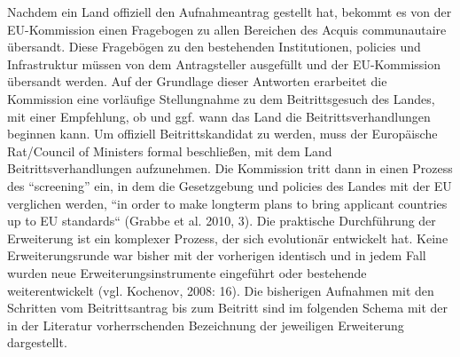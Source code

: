 Nachdem ein Land offiziell den Aufnahmeantrag gestellt hat, bekommt es von der EU-Kommission einen Fragebogen zu allen Bereichen des Acquis communautaire übersandt. Diese Fragebögen zu den bestehenden Institutionen, policies und Infrastruktur müssen von dem Antragsteller ausgefüllt und der EU-Kommission übersandt werden. Auf der Grundlage dieser Antworten erarbeitet die Kommission eine vorläufige Stellungnahme zu dem Beitrittsgesuch des Landes, mit einer Empfehlung, ob und ggf. wann das Land die Beitrittsverhandlungen beginnen kann. Um offiziell Beitrittskandidat zu werden, muss der Europäische Rat/Council of Ministers formal beschließen, mit dem Land Beitrittsverhandlungen aufzunehmen. Die Kommission tritt dann in einen Prozess des “screening” ein, in dem die Gesetzgebung und policies des Landes mit der EU verglichen werden, “in order to make longterm plans to bring applicant countries up to EU standards“ (Grabbe et al. 2010, 3).
Die praktische Durchführung der Erweiterung ist ein komplexer Prozess, der sich evolutionär entwickelt hat. Keine Erweiterungsrunde war bisher mit der vorherigen identisch und in jedem Fall wurden neue Erweiterungsinstrumente eingeführt oder bestehende weiterentwickelt (vgl. Kochenov, 2008: 16). Die bisherigen Aufnahmen mit den Schritten vom Beitrittsantrag bis zum Beitritt sind im folgenden Schema mit der in der Literatur vorherrschenden Bezeichnung der jeweiligen Erweiterung dargestellt.\\
